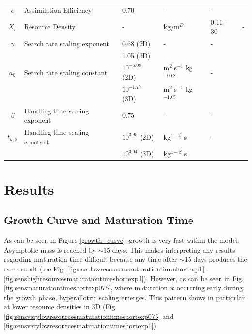 \documentclass[a4paper, 11pt, hidelinks]{article} %
\begin{document}
\begin{centering}
\begin{table}[h!]
\begin{tabular}{c p{3cm} l l l p{3cm}}
				$\epsilon$	& Assimilation Efficiency & 0.70 & - & - 		& \cite{Peters1983} \\
				$X_r$ 		& Resource Density		& -		& kg/m$^D$		& 0.11 - 30				& -\\
				$\gamma$	& Search rate scaling exponent & 0.68 (2D)	& - & - & \cite{Pawar2012} \\
				&						& 1.05 (3D)\\
				$a_0$		& Search rate scaling constant & $10^{-3.08}$ (2D) & m$^2$ s$^{-1}$ kg$^{-0.68}$   & - &\cite{Pawar2012}	\\
				&						& $10^{-1.77}$ (3D)& m$^2$ s$^{-1}$ kg$^{-1.05} $\\
				$\beta$		& Handling time scaling exponent& 0.75 & - & - & \cite{Pawar2012}\\
				$t_{h, 0}$	& Handling time scaling constant& $10^{3.95}$ (2D) &kg$^{1-\beta}$ s& -& \cite{Pawar2012}	\\
				&						& $10^{3.04}$ (3D)			&kg$^{1-\beta}$ s\\
				\hline
			\end{tabular}
		\end{table}
	\end{centering}

	\newpage

	\nolinenumbers
\section{Results}
	\linenumbers
	

	\subsection{Growth Curve and Maturation Time}
	As can be seen in Figure \ref{growth_curve}, growth is very fast within the model.  Asymptotic mass is reached by $\sim$15 days.  This makes interpreting any results regarding maturation time difficult %
	because any time after $\sim$15 days produces the same result (see Fig. \ref{fig:senslowresourcesmaturationtimeshortexp1} - \ref{fig:senshighresourcesmaturationtimeshortexp1}).
	However, as can be seen in Fig. \ref{fig:sensmaturationtimeshortexp075}, where maturation is occurring early during the growth phase, hyperallotric scaling emerges.  This pattern shows in particular at lower resource densities in 3D (Fig. \ref{fig:sensverylowresourcesmaturationtimeshortexp075} and \ref{fig:sensverylowresourcesmaturationtimeshortexp1})
	
\end{document}
